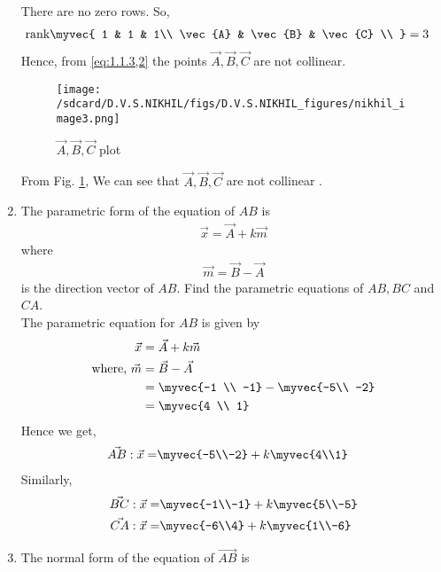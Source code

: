 \documentclass[11pt]{book}
\begin{document}
\begin{enumerate}[label=\thesection.\arabic*.,ref=\thesection.\theenumi]
There are no zero rows. So,
\begin{align}
    \text{rank}\myvec{
    1 & 1 & 1\\
    \vec{A} & \vec{B} & \vec{C} \\
    } &= 3 
\end{align}  
Hence, from \eqref{eq:1.1.3,2} the points $\vec{A},\vec{B},\vec{C}$ are not collinear. 
\begin{figure}[H]
	\texttt{[image: /sdcard/D.V.S.NIKHIL/figs/D.V.S.NIKHIL\_figures/nikhil\_image3.png]}
\caption{$\vec{A},\vec{B},\vec{C}$ plot}
\label{fig1:Triangle}
\end{figure}
From Fig. \ref{fig1:Triangle}, We can see that $\vec{A},\vec{B},\vec{C}$ are not collinear .
\item The parametric form of the equation of $AB$ is
	\begin{align}
		\vec{x}=\vec{A}+k\vec{m}
	\end{align}
	where\\
	\begin{align}
		\vec{m} = \vec{B} - \vec{A}
	\end{align}
	is the direction vector of $AB$.
	Find the parametric equations of $AB,BC$ and $CA$.
        \solution\\
	The parametric equation for $AB$ is given by
	\begin{align}
		\vec{x} &= \vec{A} + k\vec{m}\\
		\text{where, } \vec{m} &= \vec{B} -\vec{A}\\
		&= \myvec{-1 \\ -1} -\myvec{-5\\ -2}\\
		&= \myvec{4 \\ 1}
	\end{align}
	Hence we get,
	\begin{align}
		\vec{AB}: \vec{x} = &\myvec{-5\\-2} + k \myvec{4\\1}
	\end{align}
	Similarly, 
	\begin{align}
		\vec{BC}: \vec{x} = &\myvec{-1\\-1} + k \myvec{5\\-5}\\
		\vec{CA}: \vec{x} = &\myvec{-6\\4} + k \myvec{1\\-6}
	\end{align}
\item The normal form of the equation of $\vec{AB}$ is

\end{enumerate}
\end{document}

